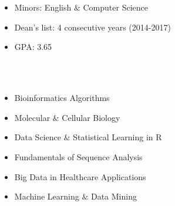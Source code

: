 \documentclass[hidelinks, 11pt]{article}
\begin{document}
\section*{}
\begin{addmargin}{.5in}

  \begin{itemize}\setlength\itemsep{-4pt}
    \item{Minors: English $\&$ Computer Science}
    \item{Dean's list: 4 consecutive years (2014-2017)}
    \item{GPA: 3.65}
  \end{itemize}
   \\ \\
  \vspace{-9pt}
  \begin{multicols}{2}
    \begin{itemize}\setlength\itemsep{-4pt}
      \item{Bioinformatics Algorithms}
      \item{Molecular $\&$ Cellular Biology}
      \item{Data Science $\&$ Statistical Learning in R}
      \item{Fundamentals of Sequence Analysis}
      \item{Big Data in Healthcare Applications}
      \item{Machine Learning $\&$ Data Mining}
    \end{itemize}
  \end{multicols}
\end{addmargin}
\vspace{-6pt}

\end{document}
